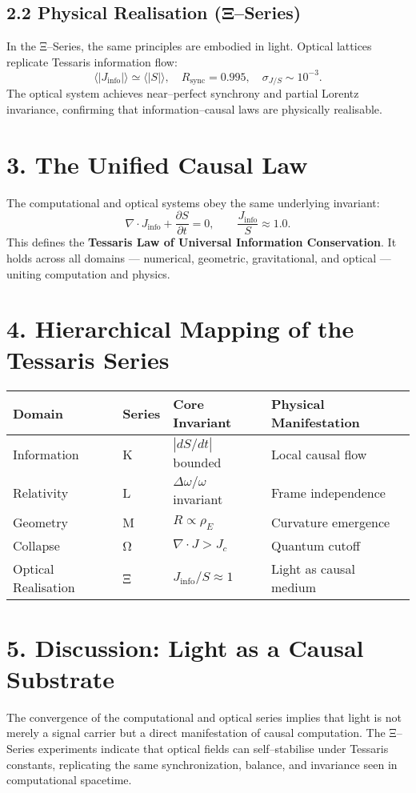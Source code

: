 \documentclass[11pt,a4paper]{article}
\begin{document}
\subsection*{2.2 Physical Realisation (Ξ--Series)}
In the Ξ--Series, the same principles are embodied in light.  
Optical lattices replicate Tessaris information flow:
\[
\langle |J_{\mathrm{info}}| \rangle \simeq \langle |S| \rangle, \quad R_{\mathrm{sync}} = 0.995, \quad \sigma_{J/S} \sim 10^{-3}.
\]
The optical system achieves near--perfect synchrony and partial Lorentz invariance, confirming that information--causal laws are physically realisable.

\section{3. The Unified Causal Law}
The computational and optical systems obey the same underlying invariant:
\[
\boxed{\nabla\!\cdot\!J_{\mathrm{info}} + \frac{\partial S}{\partial t} = 0, \qquad \frac{J_{\mathrm{info}}}{S} \approx 1.0.}
\]
This defines the \textbf{Tessaris Law of Universal Information Conservation}.  
It holds across all domains --- numerical, geometric, gravitational, and optical --- uniting computation and physics.

\section{4. Hierarchical Mapping of the Tessaris Series}
\begin{longtable}{|l|l|l|l|}
\hline
\textbf{Domain} & \textbf{Series} & \textbf{Core Invariant} & \textbf{Physical Manifestation} \\
\hline
Information & K & $|dS/dt|$ bounded & Local causal flow \\
Relativity & L & $\Delta\omega/\omega$ invariant & Frame independence \\
Geometry & M & $R \propto \rho_E$ & Curvature emergence \\
Collapse & Ω & $\nabla\!\cdot\!J > J_c$ & Quantum cutoff \\
Optical Realisation & Ξ & $J_{\mathrm{info}}/S \approx 1$ & Light as causal medium \\
\hline
\end{longtable}

\section{5. Discussion: Light as a Causal Substrate}
The convergence of the computational and optical series implies that light is not merely a signal carrier but a direct manifestation of causal computation.  
The Ξ--Series experiments indicate that optical fields can self--stabilise under Tessaris constants, replicating the same synchronization, balance, and invariance seen in computational spacetime.
\end{document}

